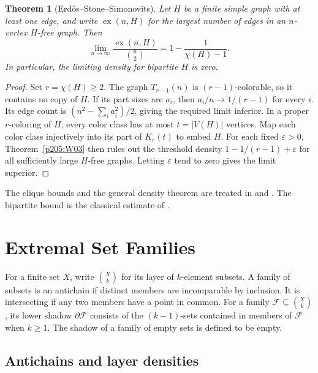 \documentclass[11pt,oneside,openany]{book}
\theoremstyle{plain}
\newtheorem{theorem}{Theorem}[chapter]
\theoremstyle{definition}
\theoremstyle{remark}
\begin{document}
\begin{theorem}[Erd\H{o}s--Stone--Simonovits]\label{p205:W04}
Let \(H\) be a finite simple graph with at least one edge, and
write \(\operatorname{ex}(n,H)\) for the largest number of edges
in an \(n\)-vertex \(H\)-free graph. Then
\[
 \lim_{n\to\infty}\frac{\operatorname{ex}(n,H)}{\binom n2}
   =1-\frac1{\chi(H)-1}.
\]
In particular, the limiting density for bipartite \(H\) is zero.
\end{theorem}
\begin{proof}
Set \(r=\chi(H)\ge2\). The graph \(T_{r-1}(n)\) is \((r-1)\)-colorable,
so it contains no copy of \(H\). If its part sizes are \(a_i\), then
\(a_i/n\to1/(r-1)\) for every \(i\). Its edge count is
\((n^2-\sum_i a_i^2)/2\), giving the required limit inferior.
In a proper \(r\)-coloring of \(H\), every color class has at most
\(t=|V(H)|\) vertices. Map each color class injectively into its
part of \(K_r(t)\) to embed \(H\). For each fixed \(\varepsilon>0\),
Theorem~\ref{p205:W03} then rules out the threshold density
\(1-1/(r-1)+\varepsilon\) for all sufficiently large \(H\)-free
graphs. Letting \(\varepsilon\) tend to zero gives the limit superior.
\end{proof}

The clique bounds and the general density theorem are treated in
\cite[Section~7.1]{diestel} and \cite[Sections~1.3 and~1.5]{zhao}.
The bipartite bound is the classical estimate of \cite{kst}.
\chapter{Extremal Set Families}

For a finite set \(X\), write \(\binom Xk\) for its layer of
\(k\)-element subsets. A family of subsets is an antichain if
distinct members are incomparable by inclusion. It is intersecting
if any two members have a point in common. For a family
\(\mathcal F\subseteq\binom Xk\), its lower shadow \(\partial\mathcal F\)
consists of the \((k-1)\)-sets contained in members of \(\mathcal F\)
when \(k\ge1\). The shadow of a family of empty sets is defined
to be empty.

\section{Antichains and layer densities}
\end{document}
